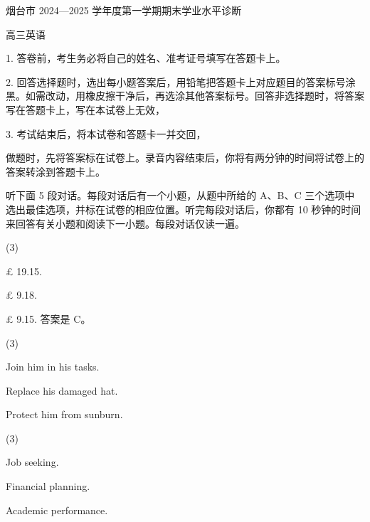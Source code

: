 \documentclass{英语试卷}
\begin{document}
\par 烟台市 2024—2025 学年度第一学期期末学业水平诊断\par
\par 高三英语\par
\begin{notice}
\par 1. 答卷前，考生务必将自己的姓名、准考证号填写在答题卡上。\par
\par 2. 回答选择题时，选出每小题答案后，用铅笔把答题卡上对应题目的答案标号涂黑。如需改动，用橡皮擦干净后，再选涂其他答案标号。回答非选择题时，将答案写在答题卡上，写在本试卷上无效，\par
\par 3. 考试结束后，将本试卷和答题卡一并交回，\par
\end{notice}
\par 做题时，先将答案标在试卷上。录音内容结束后，你将有两分钟的时间将试卷上的答案转涂到答题卡上。\par
{}
\par 听下面 5 段对话。每段对话后有一个小题，从题中所给的 A、B、C 三个选项中选出最佳选项，并标在试卷的相应位置。听完每段对话后，你都有 10 秒钟的时间来回答有关小题和阅读下一小题。每段对话仅读一遍。\par
{}
\begin{choices}(3)
  \item £ 19.15.
  \item £ 9.18.
  \item £ 9.15. 答案是 C。
\end{choices}
\begin{choices}(3)
  \item Join him in his tasks.
  \item Replace his damaged hat.
  \item Protect him from sunburn.
\end{choices}
\begin{choices}(3)
  \item Job seeking.
  \item Financial planning.
  \item Academic performance.
\end{choices}
\end{document}
